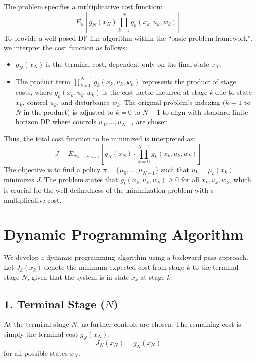 \documentclass[11pt, a4paper, oneside]{memoir}
\begin{document}
The problem specifies a multiplicative cost function:
\[
  E_w[g_N(x_N)\prod_{k=1}^{N}g_k(x_k,u_k,w_k)]
\]
To provide a well-posed DP-like algorithm within the ``basic problem framework'', we interpret the cost function as follows:
\begin{itemize}
  \item $g_N(x_N)$ is the terminal cost, dependent only on the final state $x_N$.
  \item The product term $\prod_{k=0}^{N-1} g_k(x_k, u_k, w_k)$ represents the product of stage costs, where $g_k(x_k, u_k, w_k)$ is the cost factor incurred at stage $k$ due to state $x_k$, control $u_k$, and disturbance $w_k$. The original problem's indexing ($k=1$ to $N$ in the product) is adjusted to $k=0$ to $N-1$ to align with standard finite-horizon DP where controls $u_0, \dots, u_{N-1}$ are chosen.
\end{itemize}
Thus, the total cost function to be minimized is interpreted as:
\[
  J = E_{w_0, \dots, w_{N-1}}\left[g_N(x_N) \cdot \prod_{k=0}^{N-1} g_k(x_k, u_k, w_k)\right]
\]
The objective is to find a policy $\pi = \{\mu_0, \dots, \mu_{N-1}\}$ such that $u_k = \mu_k(x_k)$ minimizes $J$.
The problem states that $g_k(x_k, u_k, w_k) \ge 0$ for all $x_k, u_k, w_k$,
which is crucial for the well-definedness of the minimization problem with a multiplicative cost.

\section{Dynamic Programming Algorithm}
We develop a dynamic programming algorithm using a backward pass approach. Let $J_k(x_k)$ denote the minimum expected cost from stage $k$ to the terminal stage $N$, given that the system is in state $x_k$ at stage $k$.
\subsection*{1. Terminal Stage ($N$)}
At the terminal stage $N$, no further controls are chosen. The remaining cost is simply the terminal cost $g_N(x_N)$.
\[
  J_N(x_N) = g_N(x_N)
\]
for all possible states $x_N$.
\end{document}
